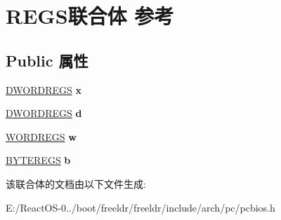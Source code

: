 \hypertarget{union_r_e_g_s}{}\section{R\+E\+G\+S联合体 参考}
\label{union_r_e_g_s}
\subsection*{Public 属性}
\begin{DoxyCompactItemize}
\item 
\mbox{\label{union_r_e_g_s_a71d0f32ba5adc6dfbee84dbbcfe466b1}} 
\hyperlink{struct_d_w_o_r_d_r_e_g_s}{D\+W\+O\+R\+D\+R\+E\+GS} {\bfseries x}
\item 
\mbox{\label{union_r_e_g_s_a1dde821f297b11034cf58fc76cb46325}} 
\hyperlink{struct_d_w_o_r_d_r_e_g_s}{D\+W\+O\+R\+D\+R\+E\+GS} {\bfseries d}
\item 
\mbox{\label{union_r_e_g_s_af87961646e24ae077dcd76e65abcc006}} 
\hyperlink{struct_w_o_r_d_r_e_g_s}{W\+O\+R\+D\+R\+E\+GS} {\bfseries w}
\item 
\mbox{\label{union_r_e_g_s_ad460c119c8d53871b831142cbe7cd8a5}} 
\hyperlink{struct_b_y_t_e_r_e_g_s}{B\+Y\+T\+E\+R\+E\+GS} {\bfseries b}
\end{DoxyCompactItemize}


该联合体的文档由以下文件生成\+:\begin{DoxyCompactItemize}
\item 
E\+:/\+React\+O\+S-\/0../boot/freeldr/freeldr/include/arch/pc/pcbios.\+h\end{DoxyCompactItemize}

